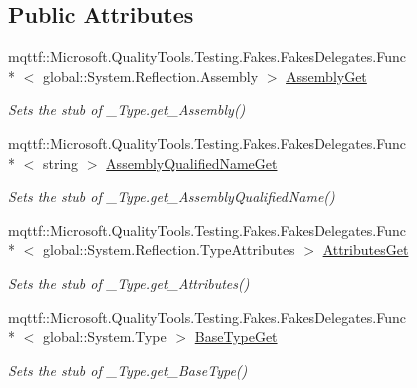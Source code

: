 \subsection*{Public Attributes}
\begin{DoxyCompactItemize}
\item 
mqttf\-::\-Microsoft.\-Quality\-Tools.\-Testing.\-Fakes.\-Fakes\-Delegates.\-Func\\*
$<$ global\-::\-System.\-Reflection.\-Assembly $>$ \hyperlink{class_system_1_1_runtime_1_1_interop_services_1_1_fakes_1_1_stub___type_ae6bb6bb0870cb4e6edffaff3b9f39278}{Assembly\-Get}
\begin{DoxyCompactList}\small\item\em Sets the stub of \-\_\-\-Type.\-get\-\_\-\-Assembly()\end{DoxyCompactList}\item 
mqttf\-::\-Microsoft.\-Quality\-Tools.\-Testing.\-Fakes.\-Fakes\-Delegates.\-Func\\*
$<$ string $>$ \hyperlink{class_system_1_1_runtime_1_1_interop_services_1_1_fakes_1_1_stub___type_a7724702f77ae55a0867cf8b052f72651}{Assembly\-Qualified\-Name\-Get}
\begin{DoxyCompactList}\small\item\em Sets the stub of \-\_\-\-Type.\-get\-\_\-\-Assembly\-Qualified\-Name()\end{DoxyCompactList}\item 
mqttf\-::\-Microsoft.\-Quality\-Tools.\-Testing.\-Fakes.\-Fakes\-Delegates.\-Func\\*
$<$ global\-::\-System.\-Reflection.\-Type\-Attributes $>$ \hyperlink{class_system_1_1_runtime_1_1_interop_services_1_1_fakes_1_1_stub___type_a8250896a28e04cb02a0de8a69cfc9d92}{Attributes\-Get}
\begin{DoxyCompactList}\small\item\em Sets the stub of \-\_\-\-Type.\-get\-\_\-\-Attributes()\end{DoxyCompactList}\item 
mqttf\-::\-Microsoft.\-Quality\-Tools.\-Testing.\-Fakes.\-Fakes\-Delegates.\-Func\\*
$<$ global\-::\-System.\-Type $>$ \hyperlink{class_system_1_1_runtime_1_1_interop_services_1_1_fakes_1_1_stub___type_ac3856b6cdb7298e7097b9dfa9193e158}{Base\-Type\-Get}
\begin{DoxyCompactList}\small\item\em Sets the stub of \-\_\-\-Type.\-get\-\_\-\-Base\-Type()\end{DoxyCompactList}\item 

\end{DoxyCompactItemize}
